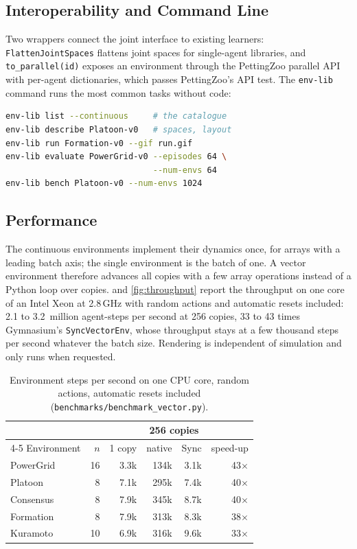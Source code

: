 \documentclass{article}
\newcommand{\code}[1]{\texttt{#1}}
\newcommand{\file}[1]{\nolinkurl{#1}}
\begin{document}
\subsection{Interoperability and Command Line}

Two wrappers connect the joint interface to existing learners:
\code{FlattenJointSpaces} flattens joint spaces for single-agent libraries,
and \code{to\_parallel(id)} exposes an environment through the PettingZoo
parallel API with per-agent dictionaries, which passes PettingZoo's API test.
The \code{env-lib} command runs the most common tasks without code:
\begin{lstlisting}[language=bash]
env-lib list --continuous     # the catalogue
env-lib describe Platoon-v0   # spaces, layout
env-lib run Formation-v0 --gif run.gif
env-lib evaluate PowerGrid-v0 --episodes 64 \
                              --num-envs 64
env-lib bench Platoon-v0 --num-envs 1024
\end{lstlisting}

\subsection{Performance}\label{sec:performance}

The continuous environments implement their dynamics once, for arrays with a
leading batch axis; the single environment is the batch of one. A vector
environment therefore advances all copies with a few array operations instead
of a Python loop over copies. \Cref{tab:throughput} and \cref{fig:throughput}
report the throughput on one core of an Intel Xeon at 2.8\,GHz with random
actions and automatic resets included: 2.1 to 3.2~million agent-steps per
second at 256 copies, 33 to 43 times Gymnasium's \code{SyncVectorEnv}, whose
throughput stays at a few thousand steps per second whatever the batch size.
Rendering is independent of simulation and only runs when requested.

\begin{table}[t]
  \caption{Environment steps per second on one CPU core, random actions,
    automatic resets included (\file{benchmarks/benchmark_vector.py}).}
  \label{tab:throughput}
  \centering\small
  \setlength{\tabcolsep}{3.5pt}
  \begin{tabular}{@{}lrrrrr@{}}
    \toprule
    & & & \multicolumn{2}{c}{256 copies} & \\
    \cmidrule(lr){4-5}
    Environment & $n$ & 1 copy & native & Sync & speed-up \\
    \midrule
    PowerGrid & 16 & 3.3k & 134k & 3.1k & 43$\times$ \\
    Platoon & 8 & 7.1k & 295k & 7.4k & 40$\times$ \\
    Consensus & 8 & 7.9k & 345k & 8.7k & 40$\times$ \\
    Formation & 8 & 7.9k & 313k & 8.3k & 38$\times$ \\
    Kuramoto & 10 & 6.9k & 316k & 9.6k & 33$\times$ \\
    \bottomrule
  \end{tabular}
\end{table}
\end{document}
